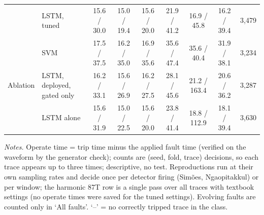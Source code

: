 \begin{table}[!htbp]
{\begin{tabular}{@{}llccccccr@{}}
 & LSTM, tuned & 15.6 / 30.0 & 15.0 / 19.4 & 15.6 / 20.0 & 21.9 / 41.2 & 16.9 / 45.8 & 16.2 / 39.4 & 3{,}479 \\
 & SVM & 17.5 / 37.5 & 16.2 / 35.0 & 16.9 / 35.6 & 35.6 / 47.4 & 35.6 / 40.4 & 31.9 / 38.1 & 3{,}234 \\
\addlinespace
Ablation & LSTM, deployed, gated only & 16.2 / 33.1 & 15.6 / 26.9 & 16.2 / 27.5 & 28.1 / 45.6 & 21.2 / 163.4 & 20.6 / 36.2 & 3{,}287 \\
 & LSTM alone & 15.6 / 31.9 & 15.0 / 22.5 & 15.6 / 20.0 & 23.8 / 41.4 & 18.8 / 112.9 & 18.1 / 39.4 & 3{,}630 \\
\bottomrule\end{tabular}}
\vspace{3pt}\par\raggedright\scriptsize\textit{Notes.} Operate time = trip time minus the applied fault time (verified on the waveform by the generator check); counts are (seed, fold, trace) decisions, so each trace appears up to three times; descriptive, no test. Reproductions run at their own sampling rates and decide once per detector firing (Sim\~oes, Ngaopitakkul) or per window; the harmonic 87T row is a single pass over all traces with textbook settings (no operate times were saved for the tuned settings). Evolving faults are counted only in `All faults'. `--' = no correctly tripped trace in the class.
\end{table}